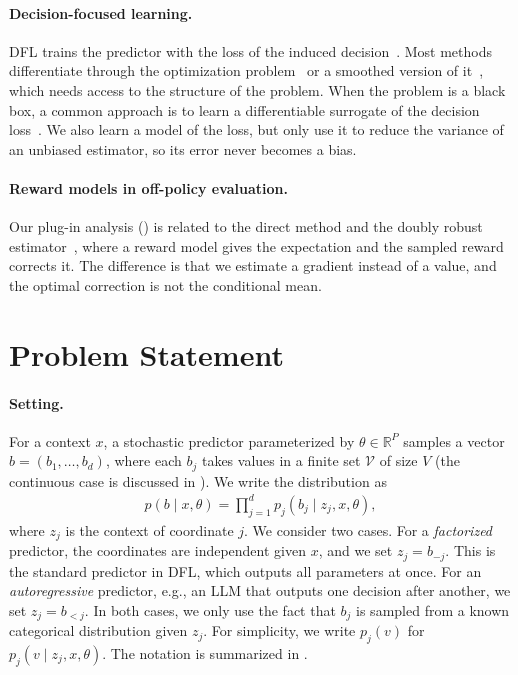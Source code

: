 \documentclass[10pt]{article}
\providecommand{\R}{\mathbb{R}}
\theoremstyle{plain}
\theoremstyle{definition}
\theoremstyle{remark}
\theoremstyle{definition}
\newcommand{\ctx}[1]{z_{#1}}                 %
\newcommand{\pj}[1]{p_{#1}}                  %
\begin{document}
\paragraph{Decision-focused learning.}
DFL trains the predictor with the loss of the induced decision~\cite{elmachtoub2022,mandi2024}. Most methods differentiate through the optimization problem~\cite{amos2017optnet,donti2017,wilder2019} or a smoothed version of it~\cite{berthet2020,vlastelica2020}, which needs access to the structure of the problem. When the problem is a black box, a common approach is to learn a differentiable surrogate of the decision loss~\cite{shah2022lodl,zharmagambetov2023lancer}. We also learn a model of the loss, but only use it to reduce the variance of an unbiased estimator, so its error never becomes a bias.

\paragraph{Reward models in off-policy evaluation.}
Our plug-in analysis () is related to the direct method and the doubly robust estimator~\cite{dudik2011}, where a reward model gives the expectation and the sampled reward corrects it. The difference is that we estimate a gradient instead of a value, and the optimal correction is not the conditional mean.

\section{Problem Statement}\label{sec:problem}

\paragraph{Setting.}
For a context $x$, a stochastic predictor parameterized by $\theta\in\R^{P}$ samples a vector $b=(b_1,\dots,b_d)$, where each $b_j$ takes values in a finite set $\mathcal V$ of size $V$ (the continuous case is discussed in ). We write the distribution as
\begin{align}\label{eq:policy}
    p(b\mid x,\theta)=\prod_{j=1}^{d}\pj{j}(b_j\mid \ctx{j},x,\theta),
\end{align}
where $\ctx{j}$ is the context of coordinate $j$. We consider two cases. For a \emph{factorized} predictor, the coordinates are independent given $x$, and we set $\ctx{j}=b_{-j}$. This is the standard predictor in DFL, which outputs all parameters at once. For an \emph{autoregressive} predictor, e.g., an LLM that outputs one decision after another, we set $\ctx{j}=b_{<j}$. In both cases, we only use the fact that $b_j$ is sampled from a known categorical distribution given $\ctx{j}$. For simplicity, we write $\pj{j}(v)$ for $\pj{j}(v\mid\ctx{j},x,\theta)$. The notation is summarized in .
\end{document}
